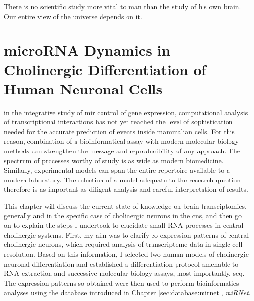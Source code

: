 \begin{savequote}[60mm]
There is no scientific study more vital to man than the study of his own brain. Our entire view of the universe depends on it.
\end{savequote}





\chapter{microRNA Dynamics in Cholinergic Differentiation of Human Neuronal Cells}

 in the integrative study of \ac{mir} control of gene expression, computational analysis of transcriptional interactions has not yet reached the level of sophistication needed for the accurate prediction of events inside mammalian cells. For this reason, combination of a bioinformatical assay with modern molecular biology methods can strengthen the message and reproducibility of any approach. The spectrum of processes worthy of study is as wide as modern biomedicine. Similarly, experimental models can span the entire repertoire available to a modern laboratory. The selection of a model adequate to the research question therefore is as important as diligent analysis and careful interpretation of results.

This chapter will discuss the current state of knowledge on brain transciptomics, generally and in the specific case of cholinergic neurons in the \ac{cns}, and then go on to explain the steps I undertook to elucidate small RNA processes in central cholinergic systems. First, my aim was to clarify co-expression patterns of central cholinergic neurons, which required analysis of transcriptome data in single-cell resolution. Based on this information, I selected two human models of cholinergic neuronal differentiation and established a differentiation protocol amenable to RNA extraction and successive molecular biology assays, most importantly, \ac{seq}. The expression patterns so obtained were then used to perform bioinformatics analyses using the database introduced in Chapter \ref{sec:database:mirnet}, \textit{miRNet}. 

